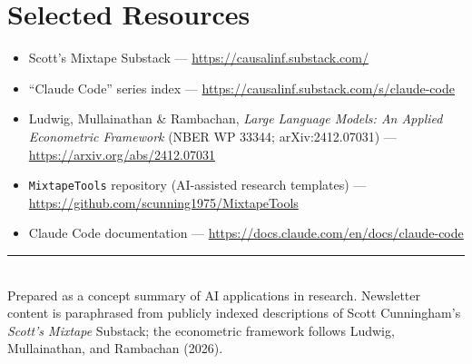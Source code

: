 \documentclass[11pt]{article}
\begin{document}
\section*{Selected Resources}

\begin{itemize}
  \item Scott's Mixtape Substack --- \url{https://causalinf.substack.com/}
  \item ``Claude Code'' series index --- \url{https://causalinf.substack.com/s/claude-code}
  \item Ludwig, Mullainathan \& Rambachan, \emph{Large Language Models: An Applied
        Econometric Framework} (NBER WP 33344; arXiv:2412.07031) ---
        \url{https://arxiv.org/abs/2412.07031}
  \item \texttt{MixtapeTools} repository (AI-assisted research templates) ---
        \url{https://github.com/scunning1975/MixtapeTools}
  \item Claude Code documentation --- \url{https://docs.claude.com/en/docs/claude-code}
\end{itemize}

\vfill
\noindent\rule{\linewidth}{0.4pt}\\[2pt]
{\small Prepared as a concept summary of AI applications in research. Newsletter
content is paraphrased from publicly indexed descriptions of Scott Cunningham's
\emph{Scott's Mixtape} Substack; the econometric framework follows Ludwig,
Mullainathan, and Rambachan (2026).}
\end{document}
